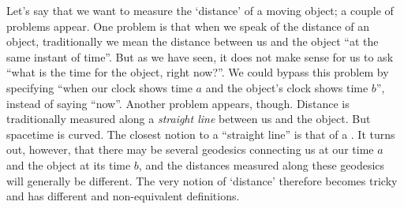 Let's say that we want to measure the \enquote*{distance} of a moving object; a couple of problems appear. One problem is that when we speak of the distance of an object, traditionally we mean the distance between us and the object \enquote{at the same instant of time}. But as we have seen, it does not make sense for us to ask \enquote{what is the time for the object, right now?}. We could bypass this problem by specifying \enquote{when our clock shows time $a$ and the object's clock shows time $b$}, instead of saying \enquote{now}. Another problem appears, though. Distance is traditionally measured along a \emph{straight line} between us and the object. But spacetime is curved. The closest notion to a \enquote{straight line} is that of a . It turns out, however, that there may be several geodesics connecting us at our time $a$ and the object at its time $b$, and the distances measured along these geodesics will generally be different. The very notion of \enquote*{distance} therefore becomes tricky and has different and non-equivalent definitions.








